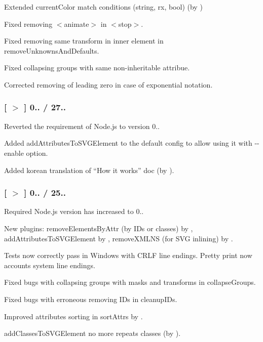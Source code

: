 
\begin{DoxyItemize}
\item Extended {\ttfamily current\+Color} match conditions (string, rx, bool) (by )
\item Fixed removing {\ttfamily $<$animate$>$} in {\ttfamily $<$stop$>$}.
\item Fixed removing same transform in inner element in {\ttfamily remove\+Unknowns\+And\+Defaults}.
\item Fixed collapsing groups with same non-\/inheritable attribue.
\item Corrected removing of leading zero in case of exponential notation.
\end{DoxyItemize}

\subsubsection*{\mbox{[} \href{https://github.com/svg/svgo/tree/v0.7.1}{\tt $>$} \mbox{]} 0.. / 27..}


\begin{DoxyItemize}
\item Reverted the requirement of Node.\+js to version 0..
\item Added {\ttfamily add\+Attributes\+To\+S\+V\+G\+Element} to the default config to allow using it with {\ttfamily -\/-\/enable} option.
\item Added korean translation of “\+How it works” doc (by ).
\end{DoxyItemize}

\subsubsection*{\mbox{[} \href{https://github.com/svg/svgo/tree/v0.7.0}{\tt $>$} \mbox{]} 0.. / 25..}


\begin{DoxyItemize}
\item Required Node.\+js version has increased to 0..
\item New plugins\+: {\ttfamily remove\+Elements\+By\+Attr} (by I\+Ds or classes) by , {\ttfamily add\+Attributes\+To\+S\+V\+G\+Element} by , {\ttfamily remove\+X\+M\+L\+NS} (for S\+VG inlining) by .
\item Tests now correctly pass in Windows with C\+R\+LF line endings. Pretty print now accounts system line endings.
\item Fixed bugs with collapsing groups with masks and transforms in {\ttfamily collapse\+Groups}.
\item Fixed bugs with erroneous removing I\+Ds in {\ttfamily cleanup\+I\+Ds}.
\item Improved attributes sorting in {\ttfamily sort\+Attrs} by .
\item {\ttfamily add\+Classes\+To\+S\+V\+G\+Element} no more repeats classes (by ).
\end{DoxyItemize}


